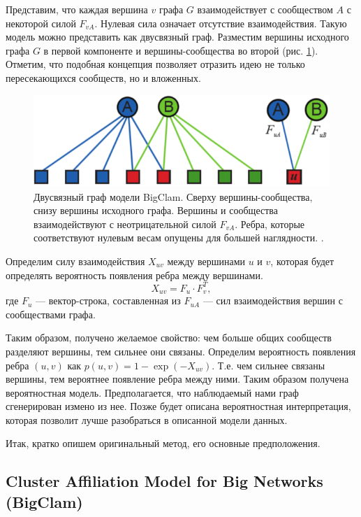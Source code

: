 \documentclass{ITaSconf}
\begin{document}
Представим, что каждая вершина $v$  графа $G$ взаимодействует с сообществом $A$ с некоторой силой $F_{vA}$. Нулевая сила означает отсутствие взаимодействия. Такую модель можно представить как двусвязный граф. Разместим вершины исходного графа $G$ в первой компоненте и вершины-сообщества во второй (рис. \ref{fig:AGM}). Отметим, что подобная концепция позволяет отразить идею не только пересекающихся сообществ, но и вложенных.
\begin{figure}[!ht]
	\centering
	\includegraphics[width=\linewidth]{imgs/BigCLAM_model.png}
	\caption{Двусвязный граф модели BigClam. Сверху вершины-сообщества, снизу вершины исходного графа. Вершины и сообщества взаимодействуют с неотрицательной силой $F_{vA}$. Ребра, которые соответствуют нулевым весам опущены для большей наглядности. \cite{yang2013overlapping}.}
	\label{fig:AGM}
\end{figure}
Определим силу взаимодействия $X_{uv}$ между вершинами $u$ и $v$, которая будет определять вероятность появления ребра между вершинами.
$$X_{uv} = F_{u} \cdot F_{v}^T,$$
где $F_{u}$ --- вектор-строка, составленная из $F_{uA}$ --- сил взаимодействия вершин с сообществами графа.

Таким образом, получено желаемое свойство: чем больше общих сообществ разделяют вершины, тем сильнее они связаны. 
Определим вероятность появления ребра $(u,v)$ как $p(u, v) = 1 - \exp ( - X_{uv})$. 
Т.е. чем сильнее связаны вершины, тем вероятнее появление ребра между ними. 
Таким образом получена вероятностная модель. Предполагается, что наблюдаемый нами граф сгенерирован измено из нее.
Позже будет описана вероятностная интерпретация, которая позволит лучше разобраться в описанной модели данных.

Итак, кратко опишем оригинальный метод, его основные предположения.

\subsection{Cluster Affiliation Model for Big Networks (BigClam)}
\end{document}
